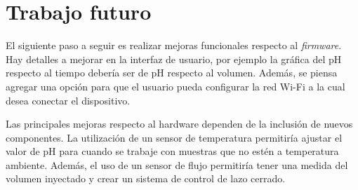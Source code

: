 \section{Trabajo futuro}

El siguiente paso a seguir es realizar mejoras funcionales respecto al \textit{firmware}. Hay detalles a mejorar en la interfaz de usuario, por ejemplo la gráfica del pH respecto al tiempo debería ser de pH respecto al volumen. Además, se piensa agregar una opción para que el usuario pueda configurar la red Wi-Fi a la cual desea conectar el dispositivo. 

Las principales mejoras respecto al hardware dependen de la inclusión de nuevos componentes. La utilización de un sensor de temperatura permitiría ajustar el valor de pH para cuando se trabaje con muestras que no estén a temperatura ambiente. Además, el uso de un sensor de flujo permitiría tener una medida del volumen inyectado y crear un sistema de control de lazo cerrado.